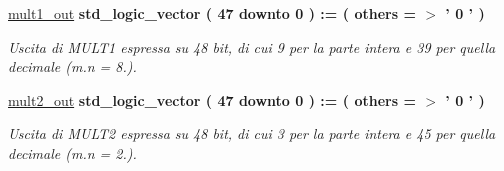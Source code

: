 \begin{DoxyCompactItemize}
\hyperlink{group___linear_regression_ga47ffff025ca221db798ee154ae332d1e}{mult1\+\_\+out} {\bfseries \textcolor{vhdlchar}{std\+\_\+logic\+\_\+vector}\textcolor{vhdlchar}{ }\textcolor{vhdlchar}{(}\textcolor{vhdlchar}{ }\textcolor{vhdlchar}{ } \textcolor{vhdldigit}{47} \textcolor{vhdlchar}{ }\textcolor{vhdlchar}{downto}\textcolor{vhdlchar}{ }\textcolor{vhdlchar}{ } \textcolor{vhdldigit}{0} \textcolor{vhdlchar}{ }\textcolor{vhdlchar}{)}\textcolor{vhdlchar}{ }\textcolor{vhdlchar}{ }\textcolor{vhdlchar}{ }\textcolor{vhdlchar}{\+:}\textcolor{vhdlchar}{=}\textcolor{vhdlchar}{ }\textcolor{vhdlchar}{(}\textcolor{vhdlchar}{ }\textcolor{vhdlchar}{ }\textcolor{vhdlchar}{others}\textcolor{vhdlchar}{ }\textcolor{vhdlchar}{ }\textcolor{vhdlchar}{=}\textcolor{vhdlchar}{ }\textcolor{vhdlchar}{$>$}\textcolor{vhdlchar}{ }\textcolor{vhdlchar}{'}\textcolor{vhdlchar}{ } \textcolor{vhdldigit}{0} \textcolor{vhdlchar}{ }\textcolor{vhdlchar}{'}\textcolor{vhdlchar}{ }\textcolor{vhdlchar}{)}\textcolor{vhdlchar}{ }} 
\begin{DoxyCompactList}\small\item\em Uscita di M\+U\+L\+T1 espressa su 48 bit, di cui 9 per la parte intera e 39 per quella decimale (m.\+n = 8.). \end{DoxyCompactList}\item 
\hyperlink{group___linear_regression_gac6c586bcd10a70e181cf575558678c99}{mult2\+\_\+out} {\bfseries \textcolor{vhdlchar}{std\+\_\+logic\+\_\+vector}\textcolor{vhdlchar}{ }\textcolor{vhdlchar}{(}\textcolor{vhdlchar}{ }\textcolor{vhdlchar}{ } \textcolor{vhdldigit}{47} \textcolor{vhdlchar}{ }\textcolor{vhdlchar}{downto}\textcolor{vhdlchar}{ }\textcolor{vhdlchar}{ } \textcolor{vhdldigit}{0} \textcolor{vhdlchar}{ }\textcolor{vhdlchar}{)}\textcolor{vhdlchar}{ }\textcolor{vhdlchar}{ }\textcolor{vhdlchar}{ }\textcolor{vhdlchar}{\+:}\textcolor{vhdlchar}{=}\textcolor{vhdlchar}{ }\textcolor{vhdlchar}{(}\textcolor{vhdlchar}{ }\textcolor{vhdlchar}{ }\textcolor{vhdlchar}{others}\textcolor{vhdlchar}{ }\textcolor{vhdlchar}{ }\textcolor{vhdlchar}{=}\textcolor{vhdlchar}{ }\textcolor{vhdlchar}{$>$}\textcolor{vhdlchar}{ }\textcolor{vhdlchar}{'}\textcolor{vhdlchar}{ } \textcolor{vhdldigit}{0} \textcolor{vhdlchar}{ }\textcolor{vhdlchar}{'}\textcolor{vhdlchar}{ }\textcolor{vhdlchar}{)}\textcolor{vhdlchar}{ }} 
\begin{DoxyCompactList}\small\item\em Uscita di M\+U\+L\+T2 espressa su 48 bit, di cui 3 per la parte intera e 45 per quella decimale (m.\+n = 2.). \end{DoxyCompactList}\item 

\end{DoxyCompactItemize}
